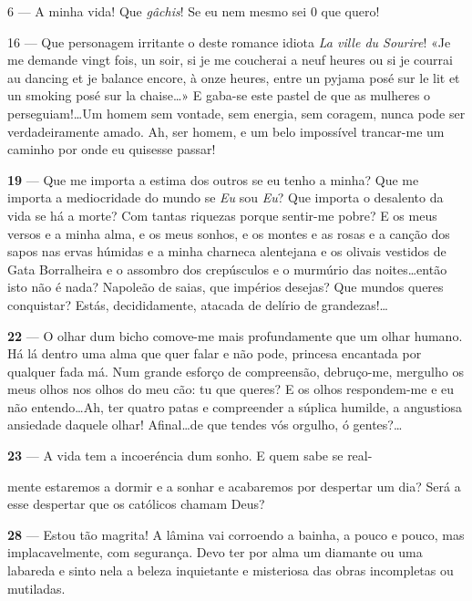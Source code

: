 6 — A minha vida! Que \textit{gâchis}! Se eu nem mesmo sei
0 que quero!

16 — Que personagem irritante o deste romance idiota
\textit{La ville du Sourire}! «Je me demande vingt fois,
un soir, si je me coucherai a neuf heures ou si je courrai
au dancing et je balance encore, à onze heures, entre
un pyjama posé sur le lit et un smoking posé sur la
chaise\ldots» E gaba-se este pastel de que as mulheres o
perseguiam!\ldots Um homem sem vontade, sem energia,
sem coragem, nunca pode ser verdadeiramente amado.
Ah, ser homem, e um belo impossível trancar-me um
caminho por onde eu quisesse passar!

\pagebreak



\textbf{19} — Que me importa a estima dos outros se eu tenho
a minha? Que me importa a mediocridade do mundo
se \textit{Eu} sou \textit{Eu}? Que importa o desalento da vida se há
a morte? Com tantas riquezas porque sentir-me pobre?
E os meus versos e a minha alma, e os meus sonhos,
e os montes e as rosas e a canção dos sapos nas ervas
húmidas e a minha charneca alentejana e os olivais
vestidos de Gata Borralheira e o assombro dos 
crepúsculos e o murmúrio das noites\ldots então isto não é
nada? Napoleão de saias, que impérios desejas? Que
mundos queres conquistar? Estás, decididamente, 
atacada de delírio de grandezas!\ldots

\textbf{22} — O olhar dum bicho comove-me mais 
profundamente que um olhar humano. Há lá dentro 
uma alma que quer falar e não pode, princesa encantada
por qualquer fada má. Num grande esforço de compreensão,
debruço-me, mergulho os meus olhos nos olhos do
meu cão: tu que queres? E os olhos respondem-me e
eu não entendo\ldots Ah, ter quatro patas e compreender
a súplica humilde, a angustiosa ansiedade daquele
olhar! Afinal\ldots de que tendes vós orgulho, ó gentes?\ldots

\textbf{23} — A vida tem a incoeréncia dum sonho. E quem sabe se real-


\pagebreak



mente estaremos a dormir e a sonhar e acabaremos por
despertar um dia? Será a esse despertar que os católicos
chamam Deus?

\textbf{28} — Estou tão magrita! A lâmina vai corroendo a
bainha, a pouco e pouco, mas implacavelmente, com
segurança. Devo ter por alma um diamante ou uma
labareda e sinto nela a beleza inquietante e misteriosa
das obras incompletas ou mutiladas.

